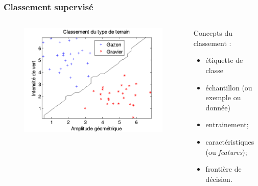    \begin{frame}
        \frametitle{Classement supervisé}
        \begin{columns}
            \begin{column}{0.4\textwidth}
                \vspace{-4mm}
                \begin{figure}
                    \includegraphics[width=1.2\textwidth]{./media/machineLearning.png}
                \end{figure}                   
            \end{column} 
                            
            \begin{column}{0.6\textwidth}
                Concepts du classement :\\ \vspace{3mm}                
                \begin{itemize}
                    \item étiquette de classe
                    \item échantillon (ou exemple ou donnée)
                    \item entrainement;
                    \item caractéristiques (ou \textit{features});                         
                    \item frontière de décision.
                \end{itemize}           
            \end{column}
        \end{columns}          
    \end{frame}
    
